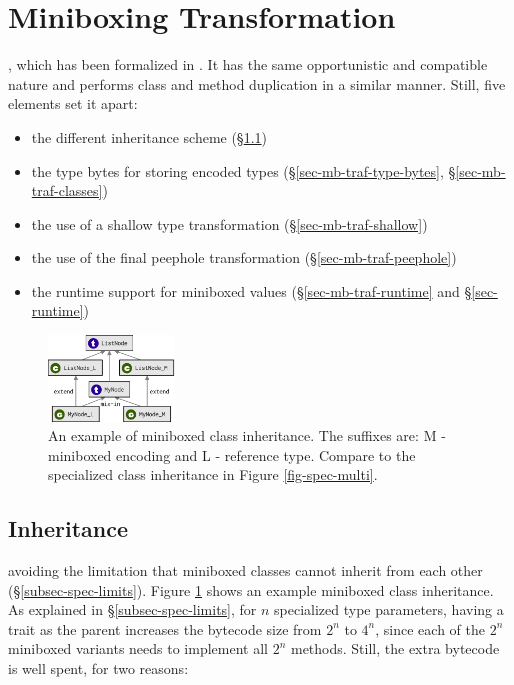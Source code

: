 \section{Miniboxing Transformation}
\label{sec-mb-traf}

, which has been formalized in \cite{iuli-thesis}. It has the same opportunistic and compatible nature and performs class and method duplication in a similar manner. Still, five elements set it apart:

\begin{itemize}
\item the different inheritance scheme (\S\ref{sec-mb-traf-inheritance})
\item the type bytes for storing encoded types (\S\ref{sec-mb-traf-type-bytes}, \S\ref{sec-mb-traf-classes})
\item the use of a shallow type transformation (\S\ref{sec-mb-traf-shallow})
\item the use of the final peephole transformation (\S\ref{sec-mb-traf-peephole})
\item the runtime support for miniboxed values (\S\ref{sec-mb-traf-runtime} and \S\ref{sec-runtime})
\end{itemize}

\begin{figure}[t]
    \centering
    \includegraphics[width=0.30\textwidth]{diags/mbox-multi.eps}
    \caption{An example of miniboxed class inheritance. The suffixes are: M - miniboxed encoding and L - reference type. Compare to the specialized class inheritance in Figure \ref{fig-spec-multi}.}
    \label{fig-mbox-multi}
\end{figure}


\subsection{Inheritance}
\label{sec-mb-traf-inheritance}
 avoiding the limitation that miniboxed classes cannot  inherit from each other (\S\ref{subsec-spec-limits}). Figure \ref{fig-mbox-multi} shows an example miniboxed class inheritance. As explained in \S\ref{subsec-spec-limits}, for $n$ specialized type parameters, having a trait as the parent increases the bytecode size from $2^n$ to $4^n$, since each of the $2^n$ miniboxed variants needs to implement all $2^n$ methods. Still, the extra bytecode is well spent, for two reasons:

